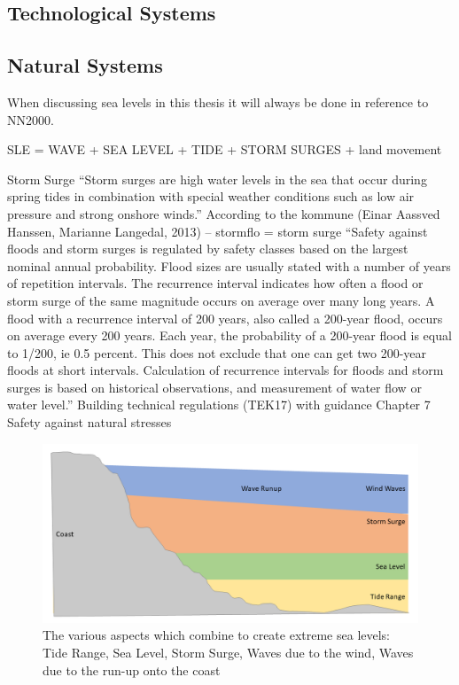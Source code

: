 \subsection{Technological Systems}



\subsection{Natural Systems }
When discussing sea levels in this thesis it will always be done in reference to NN2000. 

SLE = WAVE + SEA LEVEL + TIDE + STORM SURGES + land movement

Storm Surge
“Storm surges are high water levels in the sea that occur during spring tides in combination with special weather conditions such as low air pressure and strong onshore winds.” According to the kommune (Einar Aassved Hanssen, Marianne Langedal, 2013) – stormflo = storm surge
“Safety against floods and storm surges is regulated by safety classes based on the
largest nominal annual probability. Flood sizes are usually stated with a number of
years of repetition intervals. The recurrence interval indicates how often a flood or
storm surge of the same magnitude occurs on average over many long years. A flood
with a recurrence interval of 200 years, also called a 200-year flood, occurs on average
every 200 years. Each year, the probability of a 200-year flood is equal to 1/200, ie 0.5 percent.
This does not exclude that one can get two 200-year floods at short intervals.
Calculation of recurrence intervals for floods and storm surges is based on historical
observations, and measurement of water flow or water level.”
Building technical regulations (TEK17) with guidance Chapter 7 Safety against natural stresses

\begin{figure}[h]
    \centering
    \includegraphics[width=1\textwidth]{fig_theory/sea level extremes.png}

    \caption{The various aspects which combine to create extreme sea levels: Tide Range, Sea Level, Storm Surge, Waves due to the wind, Waves due to the run-up onto the coast}
    \label{fig:my_label}
\end{figure}


